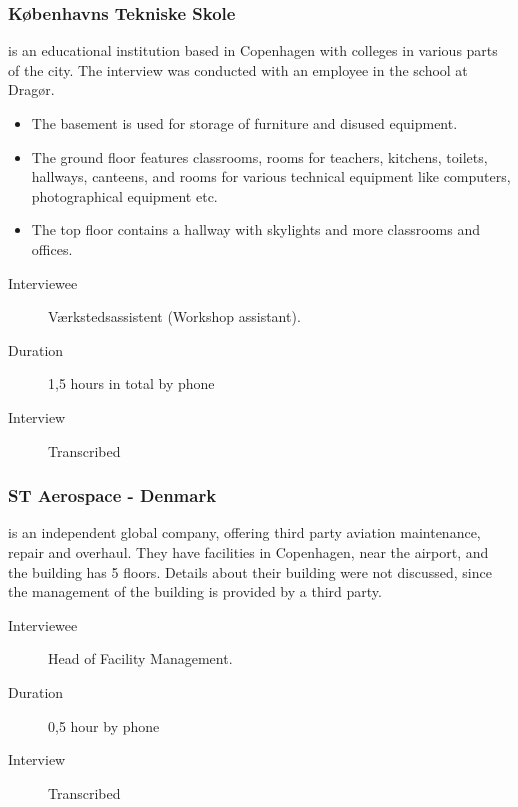 \subsubsection{K\o benhavns Tekniske Skole} is an educational institution based in Copenhagen with colleges in various parts of the city. The interview was conducted with an employee in the school at Drag\o r. 
\begin{itemize}
	\item The basement is used for storage of furniture and disused equipment.
	\item The ground floor features classrooms, rooms for teachers, kitchens, toilets, hallways, canteens, and rooms for various technical equipment like computers, photographical equipment etc.
	\item The top floor contains a hallway with skylights and more classrooms and offices.
\end{itemize}
\begin{description}
	\item[Interviewee] Værkstedsassistent (Workshop assistant).
	\item[Duration] 1,5 hours in total by phone
	\item[Interview] Transcribed
\end{description}

\subsubsection{ST Aerospace - Denmark} is an independent global company, offering third party aviation maintenance, repair and overhaul. They have facilities in Copenhagen, near the airport, and the building has 5 floors. Details about their building were not discussed, since the management of the building is provided by a third party.
\begin{description}
	\item[Interviewee] Head of Facility Management.
	\item[Duration] 0,5 hour by phone
	\item[Interview] Transcribed
\end{description}

